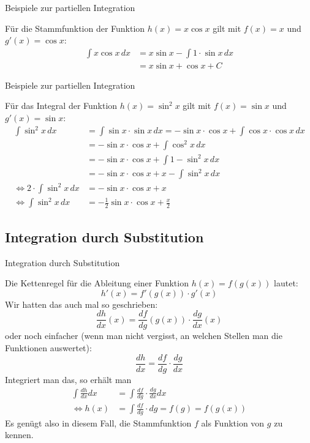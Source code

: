 \begin{frame}{Beispiele zur partiellen Integration}
\begin{example}
	Für die Stammfunktion der Funktion $h(x)=x \cos x$ gilt mit $f(x)=x$ und $g'(x)=\cos x$:
	\begin{align*}
		\int x \cos x \, dx & = x \sin x - \int 1 \cdot \sin x \, dx \\
		& = x \sin x + \cos x + C 
	\end{align*}
\end{example}
\end{frame}

\begin{frame}{Beispiele zur partiellen Integration}
\small{	
	\begin{example}
		Für das Integral der Funktion $h(x)= \sin^{2} x$ gilt mit $f(x)=\sin x$ und $g'(x)= \sin x$:
		\begin{align*}
			\int \sin^{2} x \, dx & = \int \sin x \cdot \sin x \, dx = -\sin x \cdot \cos x + \int \cos x \cdot \cos x \, dx \\
			& = -\sin x \cdot \cos x + \int \cos^{2} x \, dx \\ 
			& = -\sin x \cdot \cos x + \int 1-\sin^{2} x \, dx\\
			& = -\sin x \cdot \cos x + x - \int \sin^{2} x \, dx \\
			\Leftrightarrow 2\cdot \int \sin^{2} x\, dx & = -\sin x \cdot \cos x + x \\
			\Leftrightarrow  \int \sin^{2} x\, dx & = -\frac{1}{2}\sin x \cdot \cos x + \frac{x}{2}
		\end{align*}
	\end{example}}
\end{frame}

\subsection{Integration durch Substitution}
\begin{frame}{Integration durch Substitution}
\begin{bemerkung}
\footnotesize{	Die Kettenregel für die Ableitung einer Funktion $h(x)=f(g(x))$ lautet:
	\[
		h'(x) = f'(g(x)) \cdot g'(x)
	\]
	Wir hatten das auch mal so geschrieben:
	\[
		\frac{dh}{dx}(x) = \frac{df}{dg}(g(x)) \cdot \frac{dg}{dx}(x)
	\]
	oder noch einfacher (wenn man nicht vergisst, an welchen Stellen man die Funktionen auswertet):
	\[	
		\frac{dh}{dx} = \frac{df}{dg} \cdot \frac{dg}{dx}
	\]
	Integriert man das, so erhält man
	\begin{align*}
		\int \frac{dh}{dx} dx  & = \int \frac{df}{dg} \cdot \frac{dg}{dx} dx \\
		\Leftrightarrow h(x) & = \int \frac{df}{dg} \cdot dg = f(g) = f(g(x))
	\end{align*}
	Es genügt also in diesem Fall, die Stammfunktion $f$ als Funktion von $g$ zu kennen. }
\end{bemerkung}
\end{frame}

